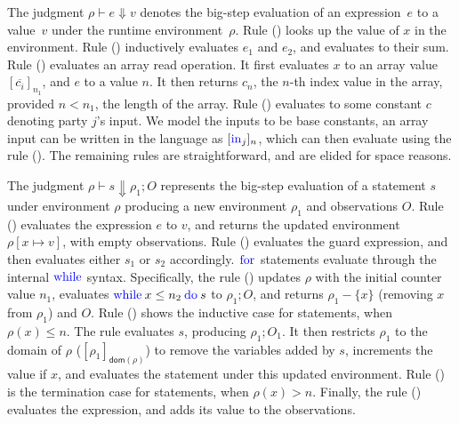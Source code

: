 The judgment $\rho \vdash e \Downarrow v$ denotes the big-step
evaluation of an expression~$e$ to a value~$v$ under the runtime
environment~$\rho$. Rule ({}) looks up the value of $x$ in
the environment. Rule ({}) inductively evaluates $e_{1}$ and
$e_{2}$, and evaluates to their sum. Rule ({})
evaluates an array read operation. It first evaluates $x$ to an array
value $[\overline{c_{i}}]_{n_{1}}$, and $e$ to a  value
$n$. It then returns $c_{n}$, the $n$-th index value in the array,
provided $n < n_{1}$, the length of the array. Rule ({})
evaluates to some constant $c$ denoting party $j$'s input. We model
the inputs to be base constants, an array input can be written in the
language as $[\kw{in}_{j}]_{n}$, which can then evaluate using the
rule ({}). The remaining rules are straightforward, and are
elided for space reasons.

The judgment $\rho \vdash s \Downarrow \rho_{1}; O$ represents the
big-step evaluation of a statement $s$ under environment $\rho$
producing a new environment $\rho_{1}$ and observations $O$. Rule
({}) evaluates the expression $e$ to $v$, and returns the
updated environment $\rho[x \mapsto v]$, with empty observations. Rule
({}) evaluates the guard expression, and then evaluates
either $s_{1}$ or $s_{2}$ accordingly. $\kw{for}$ statements evaluate
through the internal $\kw{while}$ syntax. Specifically, the rule
({}) updates $\rho$ with the initial counter value $n_{1}$,
evaluates $\loops{x}{n_{2}}{s}$ to $\rho_{1}; O$, and returns
$\rho_{1} - \{x\}$ (removing $x$ from $\rho_{1}$) and $O$. Rule
({}) shows the inductive case for 
statements, when $\rho(x) \leq n$. The rule evaluates $s$, producing
$\rho_{1}; O_{1}$. It then restricts $\rho_{1}$ to the domain of
$\rho$ ($[\rho_{1}]_{\mathsf{dom}(\rho)}$) to remove the variables
added by $s$, increments the value if $x$, and evaluates the
 statement under this updated environment. Rule
({}) is the termination case for  statements,
when $\rho(x) > n$. Finally, the rule ({}) evaluates the
expression, and adds its value to the observations.

\newcommand{\lcond}[4]{\ensuremath{{{#2}\:?_{{#1}}\:{#3}\::{#4}}}}

